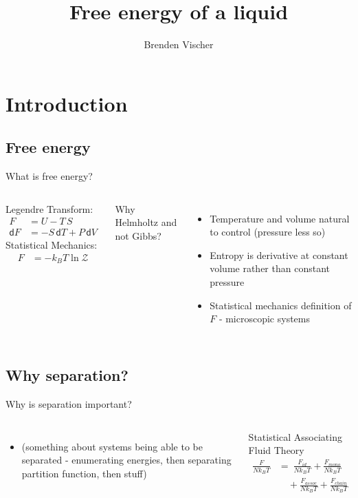 \documentclass{beamer}
\title{Free energy of a liquid}
\author{Brenden Vischer}
\newcommand*{\diff}{\mathsf{d}}
\begin{document}


\begin{frame}
	\titlepage
\end{frame}


\section*{Introduction}
\subsection*{Free energy}
\begin{frame}{What is free energy?}
		\begin{columns}
				Legendre Transform: 
				\begin{align*}
				 	F &= U - T\,S\\
				 	\diff F &= - S\, \diff T + P\, \diff V
				\end{align*}
				Statistical Mechanics: 
				\begin{align*}
					F &= - k_B T \ln \mathcal Z
				\end{align*}

			Why Helmholtz and not Gibbs?
			\begin{itemize}
				\item Temperature and volume natural to control (pressure less so)
				\item Entropy is derivative at constant volume rather than constant pressure
				\item Statistical mechanics definition of $F$ - microscopic systems  
			\end{itemize}
		\end{columns}
\end{frame}

\subsection*{Why separation?}
\begin{frame}{Why is separation important?}
		\begin{columns}[t, onlytextwidth]
			\column{.5\textwidth}
			\begin{itemize}[noitemsep]
				\item (something about systems being able to be separated - enumerating energies, then separating partition function, then stuff) 
			\end{itemize}
			\column{.5\textwidth}
			Statistical Associating Fluid Theory 
			\begin{align*}
				\frac{F}{N k_B T} &= ~\frac{F_{id}}{N k_B T} + \frac{F_{mono}}{N k_B T} \\
				&\quad +\frac{F_{assoc}}{N k_B T} + \frac{F_{chain}}{N k_B T}  
			\end{align*}
		\end{columns}
\end{frame}
\end{document}
